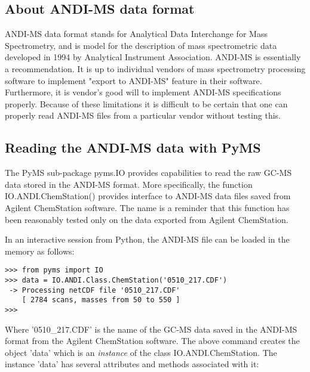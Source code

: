 \subsection{About ANDI-MS data format}

ANDI-MS data format stands for Analytical Data Interchange for Mass
Spectrometry, and is model for the description of mass spectrometric
data developed in 1994 by Analytical Instrument Association. ANDI-MS 
is essentially a recommendation. It is up to individual vendors of
mass spectrometry processing software to implement "export to ANDI-MS"
feature in their software. Furthermore, it is vendor's good will to
implement ANDI-MS specifications properly. Because of these limitations
it is difficult to be certain that one can properly read ANDI-MS
files from a particular vendor without testing this.

\subsection{Reading the ANDI-MS data with PyMS}

The PyMS sub-package pyms.IO provides capabilities to read the raw GC-MS
data stored in the ANDI-MS format. More specifically, the function
IO.ANDI.ChemStation() provides interface to ANDI-MS data files saved
from Agilent ChemStation software. The name is a reminder that this
function has been reasonably tested only on the data exported from
Agilent ChemStation.

In an interactive session from Python, the ANDI-MS file can be loaded
in the memory as follows:

\begin{verbatim}
>>> from pyms import IO
>>> data = IO.ANDI.Class.ChemStation('0510_217.CDF')
 -> Processing netCDF file '0510_217.CDF'
    [ 2784 scans, masses from 50 to 550 ]
>>>
\end{verbatim}

Where '0510\_217.CDF' is the name of the GC-MS data saved in the ANDI-MS
format from the Agilent ChemStation software.  The above command creates
the object 'data' which is an {\em instance} of the class IO.ANDI.ChemStation.
The instance 'data' has several attributes and methods associated with it:


